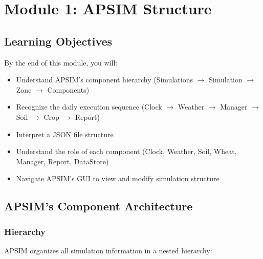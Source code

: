
\chapter{Module 1: APSIM Structure}
\label{ch:module1}

\section{Learning Objectives}

By the end of this module, you will:
\begin{itemize}
  \item Understand APSIM's component hierarchy (Simulations $\to$ Simulation $\to$ Zone $\to$ Components)
  \item Recognize the daily execution sequence (Clock $\to$ Weather $\to$ Manager $\to$ Soil $\to$ Crop $\to$ Report)
  \item Interpret a  JSON file structure
  \item Understand the role of each component (Clock, Weather, Soil, Wheat, Manager, Report, DataStore)
  \item Navigate APSIM's GUI to view and modify simulation structure
\end{itemize}

\section{APSIM's Component Architecture}

\subsection{Hierarchy}

APSIM organizes all simulation information in a nested hierarchy:

